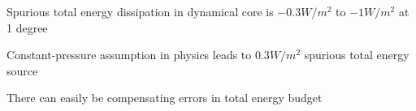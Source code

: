 \documentclass{agujournal}
\begin{document}






 \begin{keypoints}
 \item Spurious total energy dissipation in dynamical core is $-0.3W/m^2$ to $-1W/m^2$ at 1 degree
 \item Constant-pressure assumption in physics leads to $0.3W/m^2$ spurious total energy source
 \item There can easily be compensating errors in total energy budget

%


 \end{keypoints}
\end{document}
